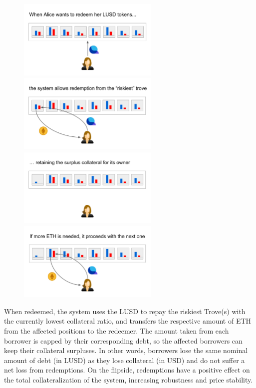 \documentclass{article}
\begin{document}
\begin{figure}[h]
\centering
\includegraphics[width=6.75cm]{a1.png}
\includegraphics[width=6.75cm]{a2.png}
\includegraphics[width=6.75cm]{a3.png}
\includegraphics[width=6.75cm]{a4.png}
\end{figure}

When redeemed, the system uses the LUSD to repay the riskiest Trove(s) with the currently lowest collateral ratio, and transfers the respective amount of ETH from the affected positions to the redeemer. The amount taken from each borrower is capped by their corresponding debt, so the affected borrowers can keep their collateral surpluses. In other words, borrowers lose the same nominal amount of debt (in LUSD) as they lose collateral (in USD) and do not suffer a net loss from redemptions. On the flipside, redemptions have a positive effect on the total collateralization of the system, increasing robustness and price stability.
\end{document}
